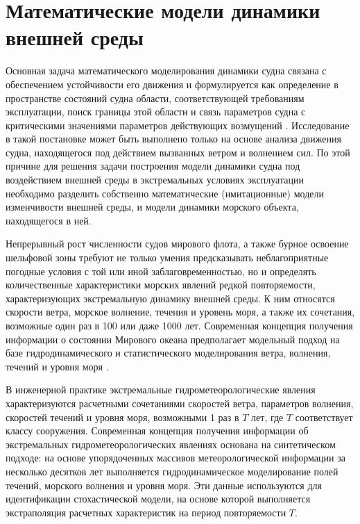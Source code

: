 \section{Математические модели динамики внешней среды}

Основная задача математического моделирования динамики судна связана с обеспечением устойчивости его движения и формулируется как определение в пространстве состояний судна области, соответствующей требованиям эксплуатации, поиск границы этой области и связь параметров судна с критическими значениями параметров действующих возмущений \citep{dk1}. Исследование в такой постановке может быть выполнено только на основе анализа движения судна, находящегося под действием вызванных ветром и волнением сил. По этой причине для решения задачи построения модели динамики судна под воздействием внешней среды в экстремальных условиях эксплуатации необходимо разделить собственно математические (имитационные) модели изменчивости внешней среды, и модели динамики морского объекта, находящегося в ней.

Непрерывный рост численности судов мирового флота, а также бурное освоение шельфовой зоны требуют не только умения предсказывать неблагоприятные погодные условия с той или иной заблаговременностью, но и определять количественные характеристики морских явлений редкой повторяемости, характеризующих экстремальную динамику внешней среды. К ним относятся скорости ветра, морское волнение, течения и уровень моря, а также их сочетания, возможные один раз в 100 или даже 1000 лет. Современная концепция получения информации о состоянии Мирового океана предполагает модельный подход на базе гидродинамического и статистического моделирования ветра, волнения, течений и уровня моря \citep{dk2}.

В инженерной практике экстремальные гидрометеорологические явления характеризуются расчетными сочетаниями скоростей ветра, параметров волнения, скоростей течений и уровня моря, возможными 1 раз в $T$ лет, где $T$ соответствует классу сооружения. Современная концепция получения информации об экстремальных гидрометеорологических явлениях основана на синтетическом подходе: на основе упорядоченных массивов метеорологической информации за несколько десятков лет выполняется гидродинамическое моделирование полей течений, морского волнения и уровня моря. Эти данные используются для идентификации стохастической модели, на основе которой выполняется экстраполяция расчетных характеристик на период повторяемости $T$. 

